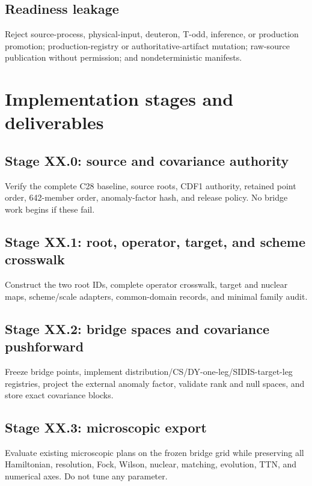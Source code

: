 \documentclass[11pt]{article}
\begin{document}
\subsection{Readiness leakage}

Reject source-process, physical-input, deuteron, T-odd, inference, or production promotion; production-registry or authoritative-artifact mutation; raw-source publication without permission; and nondeterministic manifests.

\section{Implementation stages and deliverables}
\label{sec:implementation}

\subsection{Stage XX.0: source and covariance authority}

Verify the complete C28 baseline, source roots, CDF1 authority, retained point order, 642-member order, anomaly-factor hash, and release policy.  No bridge work begins if these fail.

\subsection{Stage XX.1: root, operator, target, and scheme crosswalk}

Construct the two root IDs, complete operator crosswalk, target and nuclear maps, scheme/scale adapters, common-domain records, and minimal family audit.

\subsection{Stage XX.2: bridge spaces and covariance pushforward}

Freeze bridge points, implement distribution/CS/DY-one-leg/SIDIS-target-leg registries, project the external anomaly factor, validate rank and null spaces, and store exact covariance blocks.

\subsection{Stage XX.3: microscopic export}

Evaluate existing microscopic plans on the frozen bridge grid while preserving all Hamiltonian, resolution, Fock, Wilson, nuclear, matching, evolution, TTN, and numerical axes.  Do not tune any parameter.
\end{document}
